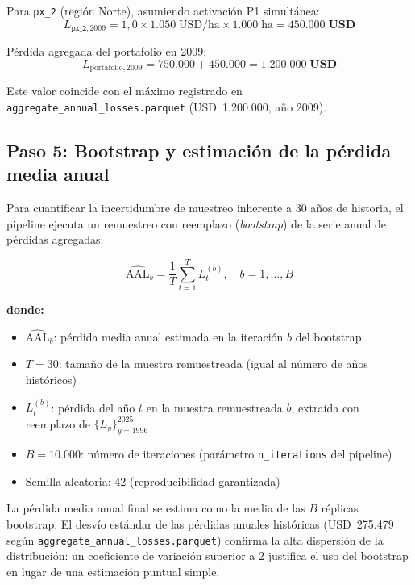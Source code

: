 \documentclass[11pt,a4paper]{article}
\begin{document}
Para \texttt{px\_2} (región Norte), asumiendo activación P1 simultánea:
\[
  L_{\texttt{px\_2}, 2009} = 1{,}0 \times 1.050\;\text{USD/ha} \times 1.000\;\text{ha} = \mathbf{450.000\;\text{USD}}
\]

Pérdida agregada del portafolio en 2009:
\[
  L_{\text{portafolio}, 2009} = 750.000 + 450.000 = \mathbf{1.200.000\;\text{USD}}
\]

Este valor coincide con el máximo registrado en \texttt{aggregate\_annual\_losses.parquet} (USD~1.200.000, año 2009).

\subsection{Paso 5: Bootstrap y estimación de la pérdida media anual}
\label{sec:bootstrap}

Para cuantificar la incertidumbre de muestreo inherente a 30 años de historia, el pipeline ejecuta un remuestreo con reemplazo (\textit{bootstrap}) de la serie anual de pérdidas agregadas:

\begin{equation}
  \widehat{\text{AAL}}_b = \frac{1}{T} \sum_{t=1}^{T} L^{(b)}_t, \quad b = 1, \ldots, B
\end{equation}

\textbf{donde:}
\begin{itemize}
  \item $\widehat{\text{AAL}}_b$: pérdida media anual estimada en la iteración $b$ del bootstrap
  \item $T = 30$: tamaño de la muestra remuestreada (igual al número de años históricos)
  \item $L^{(b)}_t$: pérdida del año $t$ en la muestra remuestreada $b$, extraída con reemplazo de $\{L_y\}_{y=1996}^{2025}$
  \item $B = 10.000$: número de iteraciones (parámetro \texttt{n\_iterations} del pipeline)
  \item Semilla aleatoria: 42 (reproducibilidad garantizada)
\end{itemize}

La pérdida media anual final se estima como la media de las $B$ réplicas bootstrap. El desvío estándar de las pérdidas anuales históricas (USD~275.479 según \texttt{aggregate\_annual\_losses.parquet}) confirma la alta dispersión de la distribución: un coeficiente de variación superior a 2 justifica el uso del bootstrap en lugar de una estimación puntual simple.
\end{document}
